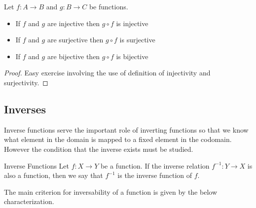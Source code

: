 \documentclass[a4paper]{article}
\begin{document}
\begin{prp}{}{} Let $f:A\to B$ and $g:B\to C$ be functions. 
\begin{itemize}
\item If $f$ and $g$ are injective then $g\circ f$ is injective
\item If $f$ and $g$ are surjective then $g\circ f$ is surjective
\item If $f$ and $g$ are bijective then $g\circ f$ is bijective
\end{itemize}\tcbline
\begin{proof}
Easy exercise involving the use of definition of injectivity and surjectivity. 
\end{proof}
\end{prp}

\subsection{Inverses}
Inverse functions serve the important role of inverting functions so that we know what element in the domain is mapped to a fixed element in the codomain. However the condition that the inverse exists must be studied. 

\begin{defn}{Inverse Functions}{} Let $f:X\to Y$ be a function. If the inverse relation $f^{-1}:Y\to X$ is also a function, then we say that $f^{-1}$ is the inverse function of $f$. 
\end{defn}

The main criterion for inversability of a function is given by the below characterization. 
\end{document}
